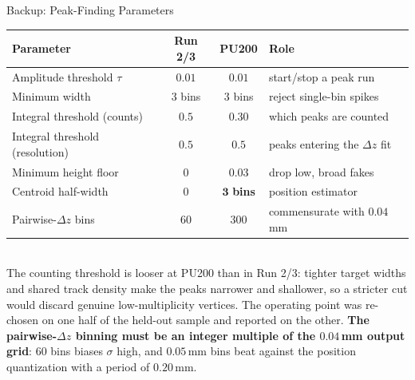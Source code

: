 \documentclass[xcolor=table,aspectratio=169]{beamer}
\begin{document}
\begin{frame}{Backup: Peak-Finding Parameters}
    \centering
    \small
    \begin{tabular}{lccl}
        \toprule
        Parameter & Run 2/3 & PU200 & Role \\
        \midrule
        Amplitude threshold $\tau$   & $0.01$ & $0.01$ & start/stop a peak run \\
        Minimum width                & $3$ bins & $3$ bins & reject single-bin spikes \\
        Integral threshold (counts)  & $0.5$  & $\mathbf{0.30}$ & which peaks are counted \\
        Integral threshold (resolution) & $0.5$ & $0.5$ & peaks entering the $\Delta z$ fit \\
        Minimum height floor         & $0$    & $\mathbf{0.03}$ & drop low, broad fakes \\
        Centroid half-width          & $0$    & $\mathbf{3}$ \textbf{bins} & position estimator \\
        Pairwise-$\Delta z$ bins     & $60$   & $300$ & commensurate with $0.04$\,mm \\
        \bottomrule
    \end{tabular}
    \vspace{1em}\\
    {\footnotesize The counting threshold is looser at PU200 than in Run 2/3: tighter
    target widths and shared track density make the peaks narrower and shallower, so a
    stricter cut would discard genuine low-multiplicity vertices. The operating point
    was re-chosen on one half of the held-out sample and reported on the other.
    \textbf{The pairwise-$\Delta z$ binning must be an integer multiple of the
    $0.04$\,mm output grid}: $60$ bins biases $\sigma$ high, and $0.05$\,mm bins beat
    against the position quantization with a period of $0.20$\,mm.}
\end{frame}
\end{document}
